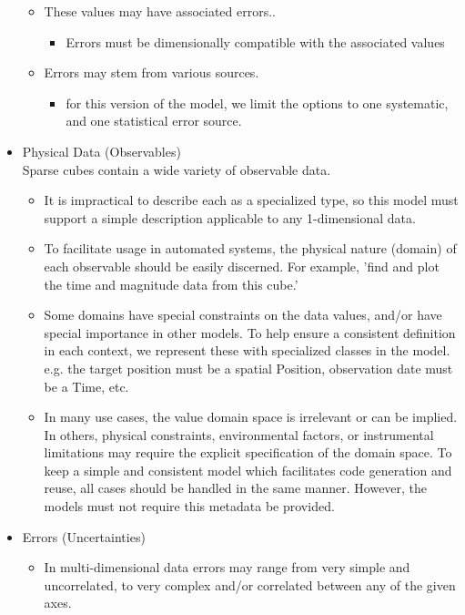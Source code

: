 \documentclass[11pt,a4paper]{ivoa}
\begin{document}
\begin{itemize}
\begin{itemize}
      \item These values may have associated errors..
        \begin{itemize}
           \item Errors must be dimensionally compatible with the associated values
        \end{itemize}
      \item Errors may stem from various sources.
      \begin{itemize}
         \item for this version of the model, we limit the options to one systematic, and one statistical error source.
      \end{itemize}
    \end{itemize}
    \item Physical Data (Observables) \\
       Sparse cubes contain a wide variety of observable data.
    \begin{itemize}
       \item It is impractical to describe each as a specialized type, so this model must support a simple description applicable to any 1-dimensional data.
       \item To facilitate usage in automated systems, the physical nature (domain) of each observable should be easily discerned.
         For example, 'find and plot the time and magnitude data from this cube.'
       \item Some domains have special constraints on the data values, and/or have special importance in other models.
         To help ensure a consistent definition in each context, we represent these with specialized classes in the model. \\
         e.g. the target position must be a spatial Position, observation date must be a Time, etc.
       \item In many use cases, the value domain space is irrelevant or can be implied.  In others, physical constraints, environmental factors,
         or instrumental limitations may require the explicit specification of the domain space.  To keep a simple and consistent model
         which facilitates code generation and reuse, all cases should be handled in the same manner.  However, the models must not require this metadata be provided.
    \end{itemize}
    \item Errors (Uncertainties)
    \begin{itemize}
      \item In multi-dimensional data errors may range from very simple and uncorrelated, to very complex and/or correlated between any of the given axes.

\end{itemize}
\end{itemize}
\end{document}
